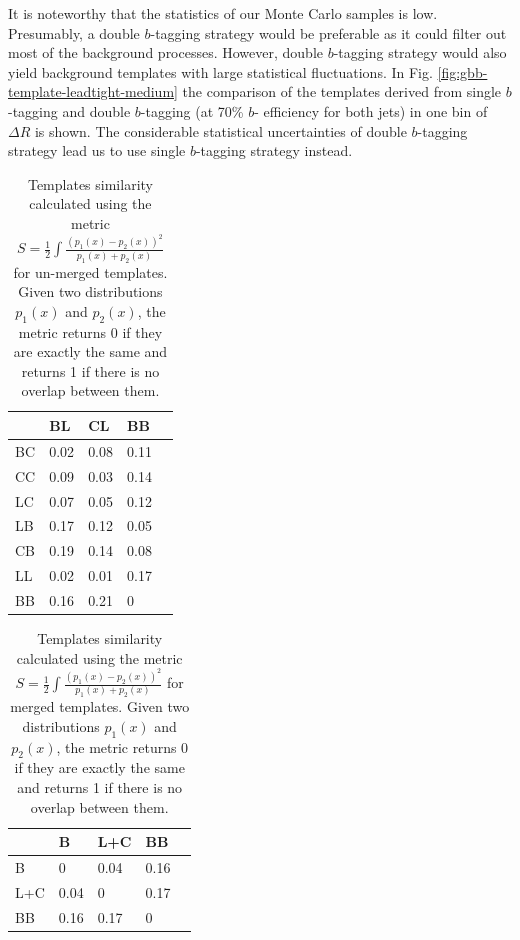 It is noteworthy that the statistics of our Monte Carlo samples is low.
Presumably, a double $b$-tagging strategy would be preferable as it could filter 
out most of the background processes.
However, double $b$-tagging strategy would also yield background templates with large 
statistical fluctuations. In Fig. \ref{fig:gbb-template-leadtight-medium} the comparison 
of the templates derived from single $b$-tagging and double $b$-tagging (at 70\% $b$-
efficiency for both jets) in one bin of $\Delta R$ is shown. The considerable statistical uncertainties
of double $b$-tagging strategy lead us to use single $b$-tagging strategy instead. 


\begin{table}[htpb]
\centering
\begin{tabular}{|l|l|l|l|l|}
\hline
   & BL   & CL    & BB   \\ \hline
BC & 0.02 & 0.08  & 0.11 \\ \hline
CC & 0.09 & 0.03  & 0.14 \\ \hline
LC & 0.07 & 0.05  & 0.12 \\ \hline
LB & 0.17 & 0.12  & 0.05 \\ \hline
CB & 0.19 & 0.14  & 0.08 \\ \hline
LL & 0.02 & 0.01  & 0.17 \\ \hline
BB & 0.16 & 0.21  & 0    \\ \hline

\end{tabular}
\caption{Templates similarity calculated using the metric $S=\frac{1}{2}\int \frac{(p_1(x)-p_2(x))^2}{p_1(x)+p_2(x)}$ for un-merged templates. Given two distributions $p_1(x)$ and $p_2(x)$, the metric returns 0 if they are exactly the same and returns 1 if there is no overlap between them.}
\label{tab:overlap-unmerged}
\end{table}



\begin{table}[htpb]
\centering
\begin{tabular}{|l|l|l|l|l|}
\hline
    & B    & L+C    & BB   \\ \hline
B   & 0    & 0.04  & 0.16 \\ \hline
L+C & 0.04 & 0     & 0.17 \\ \hline
BB  & 0.16 & 0.17  & 0    \\ \hline

\end{tabular}
\caption{Templates similarity calculated using the metric $S=\frac{1}{2}\int \frac{(p_1(x)-p_2(x))^2}{p_1(x)+p_2(x)}$ for merged templates. Given two distributions $p_1(x)$ and $p_2(x)$, the metric returns 0 if they are exactly the same and returns 1 if there is no overlap between them.}
\label{tab:overlap-merged}
\end{table}


